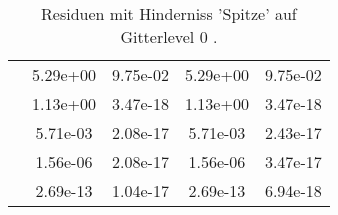 \begin{table}
\begin{tabular}{c|cc|cc|}
\multicolumn{1}{|c|}{} & \multicolumn{1}{|c|}{  5.29e+00} & \multicolumn{1}{|c|}{  9.75e-02} & \multicolumn{1}{|c|}{  5.29e+00} & \multicolumn{1}{|c|}{  9.75e-02} \\ 
\multicolumn{1}{|c|}{} & \multicolumn{1}{|c|}{  1.13e+00} & \multicolumn{1}{|c|}{  3.47e-18} & \multicolumn{1}{|c|}{  1.13e+00} & \multicolumn{1}{|c|}{  3.47e-18} \\ 
\multicolumn{1}{|c|}{} & \multicolumn{1}{|c|}{  5.71e-03} & \multicolumn{1}{|c|}{  2.08e-17} & \multicolumn{1}{|c|}{  5.71e-03} & \multicolumn{1}{|c|}{  2.43e-17} \\ 
\multicolumn{1}{|c|}{} & \multicolumn{1}{|c|}{  1.56e-06} & \multicolumn{1}{|c|}{  2.08e-17} & \multicolumn{1}{|c|}{  1.56e-06} & \multicolumn{1}{|c|}{  3.47e-17} \\ 
\multicolumn{1}{|c|}{} & \multicolumn{1}{|c|}{  2.69e-13} & \multicolumn{1}{|c|}{  1.04e-17} & \multicolumn{1}{|c|}{  2.69e-13} & \multicolumn{1}{|c|}{  6.94e-18} \\ 
\hline 
\end{tabular}\caption{Residuen mit Hinderniss 'Spitze' auf Gitterlevel 0 .}\label{tab:Residuum_Spitze_level0}
\end{table} 
